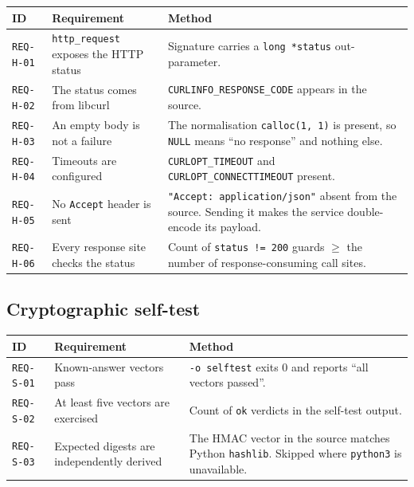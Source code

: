\documentclass[12pt]{article}
\newcommand{\code}[1]{\texttt{#1}}
\newcommand{\req}[1]{\texttt{#1}}
\begin{document}
\begin{center}
\begin{longtable}{p{2.1cm}p{5.2cm}p{6.2cm}}
  \toprule
  \textbf{ID} & \textbf{Requirement} & \textbf{Method} \\
  \midrule\endhead
  \req{REQ-H-01} & \code{http\_request} exposes the HTTP status
    & Signature carries a \code{long *status} out-parameter. \\
  \req{REQ-H-02} & The status comes from libcurl
    & \code{CURLINFO\_RESPONSE\_CODE} appears in the source. \\
  \req{REQ-H-03} & An empty body is not a failure
    & The normalisation \code{calloc(1,\,1)} is present, so
      \code{NULL} means ``no response'' and nothing else. \\
  \req{REQ-H-04} & Timeouts are configured
    & \code{CURLOPT\_TIMEOUT} and \code{CURLOPT\_CONNECTTIMEOUT}
      present. \\
  \req{REQ-H-05} & No \code{Accept} header is sent
    & \code{"Accept: application/json"} absent from the source.
      Sending it makes the service double-encode its payload. \\
  \req{REQ-H-06} & Every response site checks the status
    & Count of \code{status != 200} guards $\geq$ the number of
      response-consuming call sites. \\
  \bottomrule
\end{longtable}
\end{center}

\subsection{Cryptographic self-test}

\begin{center}
\begin{longtable}{p{2.1cm}p{5.2cm}p{6.2cm}}
  \toprule
  \textbf{ID} & \textbf{Requirement} & \textbf{Method} \\
  \midrule\endhead
  \req{REQ-S-01} & Known-answer vectors pass
    & \code{-o selftest} exits 0 and reports ``all vectors passed''. \\
  \req{REQ-S-02} & At least five vectors are exercised
    & Count of \code{ok} verdicts in the self-test output. \\
  \req{REQ-S-03} & Expected digests are independently derived
    & The HMAC vector in the source matches Python \code{hashlib}.
      Skipped where \code{python3} is unavailable. \\
  \bottomrule
\end{longtable}
\end{center}
\end{document}
